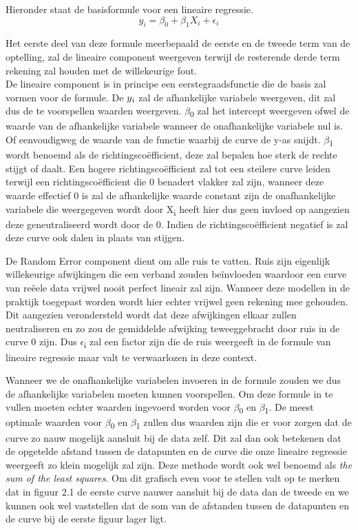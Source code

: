 Hieronder staat de basisformule voor een lineaire regressie. 
\begin{equation}
y_i = \beta_0 + \beta_1 X_i + \epsilon_i
\end{equation}

Het eerste deel van deze formule meerbepaald de eerste en de tweede term van de optelling, zal de lineaire component weergeven terwijl de resterende derde term rekening zal houden met de willekeurige fout.
\\ De lineaire component is in principe een eerstegraadsfunctie die de basis zal vormen voor de formule. De $y\textsubscript{i}$ zal de afhankelijke variabele weergeven, dit zal dus de te voorspellen waarden weergeven. $\beta$\textsubscript{0} zal het intercept weergeven ofwel de waarde van de afhankelijke variabele wanneer de onafhankelijke variabele nul is. Of eenvoudigweg de waarde van de functie waarbij de curve de y-as snijdt. $\beta$\textsubscript{1} wordt benoemd als de richtingsco\"{e}fficient, deze zal bepalen hoe sterk de rechte stijgt of daalt. Een hogere richtingsco\"{e}fficient zal tot een steilere curve leiden terwijl een richtingsco\"{e}fficient die 0 benadert vlakker zal zijn, wanneer deze waarde effectief 0 is zal de afhankelijke waarde constant zijn de onafhankelijke variabele die weergegeven wordt door X\textsubscript{i} heeft hier dus geen invloed op aangezien deze geneutraliseerd wordt door de 0. Indien de richtingsco\"{e}fficient negatief is zal deze curve ook dalen in plaats van stijgen.

De Random Error component dient om alle ruis te vatten. Ruis zijn eigenlijk willekeurige afwijkingen die een verband zouden be\"{i}nvloeden waardoor een curve van re\"{e}ele data vrijwel nooit perfect lineair zal zijn. Wanneer deze modellen in de praktijk toegepast worden wordt hier echter vrijwel geen rekening mee gehouden. Dit aangezien verondersteld wordt dat deze afwijkingen elkaar zullen neutraliseren en zo zou de gemiddelde afwijking teweeggebracht door ruis in de curve 0 zijn. Dus $\epsilon$\textsubscript{i} zal een factor zijn die de ruis weergeeft in de formule van lineaire regressie maar valt te verwaarlozen in deze context.

Wanneer we de onafhankelijke variabelen invoeren in de formule zouden we dus de afhankelijke variabelen moeten kunnen voorspellen. Om deze formule in te vullen moeten echter waarden ingevoerd worden voor $\beta$\textsubscript{0} en $\beta$\textsubscript{1}. De meest optimale waarden voor $\beta$\textsubscript{0} en $\beta$\textsubscript{1} zullen dus waarden zijn die er voor zorgen dat de curve zo nauw mogelijk aansluit bij de data zelf. Dit zal dan ook betekenen dat de opgetelde afstand tussen de datapunten en de curve die onze lineaire regressie weergeeft zo klein mogelijk zal zijn. Deze methode wordt ook wel benoemd als \textit{the sum of the least squares}. Om dit grafisch even voor te stellen valt op te merken dat in figuur 2.1  de eerste curve nauwer aansluit bij de data dan de tweede en we kunnen ook wel vaststellen dat de som van de afstanden tussen de datapunten en de curve bij de eerste figuur lager ligt.

